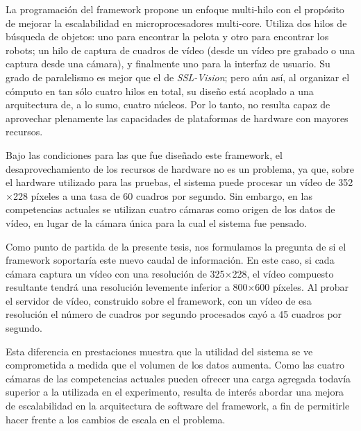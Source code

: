 La programación del framework propone un enfoque multi-hilo con el propósito de
mejorar la escalabilidad en microprocesadores multi-core. Utiliza dos hilos de
búsqueda de objetos: uno para encontrar la pelota y otro para encontrar los
robots; un hilo de captura de cuadros de vídeo (desde un vídeo pre grabado o una
captura desde una cámara), y finalmente uno para la interfaz de usuario. Su
grado de paralelismo es mejor que el de \emph{SSL-Vision}; pero aún así, al
organizar el cómputo en tan sólo cuatro hilos en total, su diseño está acoplado
a una arquitectura de, a lo sumo, cuatro núcleos. Por lo tanto, no resulta capaz
de aprovechar plenamente las capacidades de plataformas de hardware con mayores
recursos.

Bajo las condiciones para las que fue diseñado este framework, el
desaprovechamiento de los recursos de hardware no es un problema, ya que, sobre
el hardware utilizado para las pruebas, el sistema puede procesar un vídeo de
352$\times$228 píxeles a una tasa de 60 cuadros por segundo. Sin embargo, en las
competencias actuales se utilizan cuatro cámaras como origen de los datos de
vídeo, en lugar de la cámara única para la cual el sistema fue pensado.

Como punto de partida de la presente tesis, nos formulamos la pregunta de si el
framework soportaría este nuevo caudal de información. En este caso, si cada
cámara captura un vídeo con una resolución de 325$\times$228, el vídeo compuesto
resultante tendrá una resolución levemente inferior a 800$\times$600 píxeles.
Al probar el servidor de vídeo, construido sobre el framework, con un vídeo de
esa resolución el número de cuadros por segundo procesados cayó a 45 cuadros por
segundo.

Esta diferencia en prestaciones muestra que la utilidad del sistema se ve
comprometida a medida que el volumen de los datos aumenta. Como las cuatro
cámaras de las competencias actuales pueden ofrecer una carga agregada todavía
superior a la utilizada en el experimento, resulta de interés abordar una mejora
de escalabilidad en la arquitectura de software del framework, a fin de
permitirle hacer frente a los cambios de escala en el problema.
